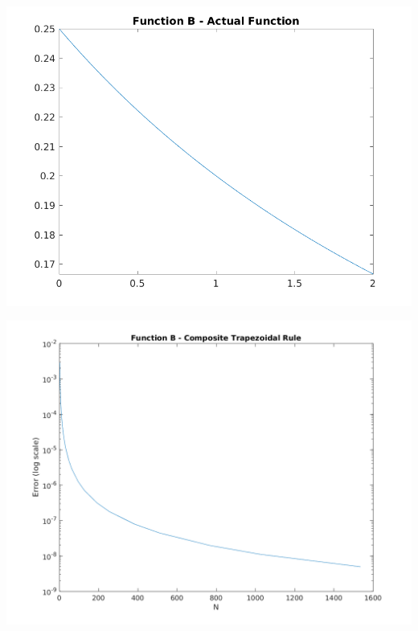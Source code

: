 \documentclass[a4paper]{article}
\begin{document}
\begin{center}
	\includegraphics[width=1\textwidth]{../output/b_actual.png}
	\label{fig:b_act}
\end{center}

\begin{center}
	\includegraphics[width=1\textwidth]{../output/b_trapezoidal.png}
	\label{fig:b_trap}
\end{center}
\end{document}
